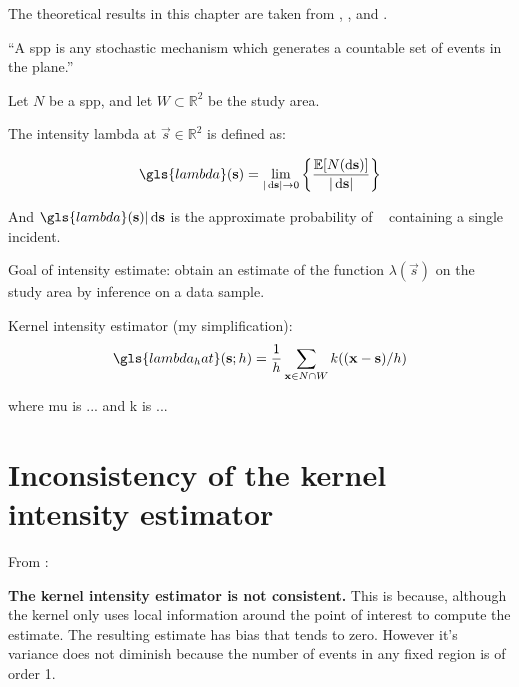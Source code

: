 


The theoretical results in this chapter are taken from \citet{diggle1988equivalence}, \citet{guan2008consistent}, and \citet{wand1994kernel}.

\begin{defn}
``A \gls{spp} is any stochastic mechanism which generates a countable set of events in the plane.''
\end{defn}

Let \(N\) be a \gls{spp}, and let \(W \subset \mathbb{R}^2 \) be the study area.

The intensity \gls{lambda} at \(\vec{s} \in \mathbb{R}^2\) is defined as:

\begin{equation}
\label{eq:lambda}
    \gls{lambda} (\vec{s}) = \lim_{|\ds| \to 0}
        \left\{
            \frac{\mathbb{E}[N(\ds)]}%
            {|\ds|}
        \right\}
\end{equation}

And \(\gls{lambda}(\vec{s})|\ds\) is the approximate probability of \ds~ containing a single incident.

Goal of intensity estimate: obtain an estimate of the function \(\lambda(\vec{s})\) on the study area by inference on a data sample.

Kernel intensity estimator (my simplification):
\begin{equation}
\label{eq:lambda_hat}
    \gls{lambda_hat}(\vec{s}; h) = \frac{1}{h} \sum_{\vec{x} \in N \cap W}{k((\vec{x}-\vec{s})/h)}
\end{equation}

where \gls{mu} is ... and \gls{k} is ...

%
%
\section{Inconsistency of the kernel intensity estimator}

From \citet{guan2008consistent}:

{
\color{red}
\textbf{The kernel intensity estimator is not consistent.}
This is because, although the kernel only uses local information around the point of interest to compute the estimate.
The resulting estimate has bias that tends to zero.
However it's variance does not diminish because the number of events in any fixed region is of order 1.
}

